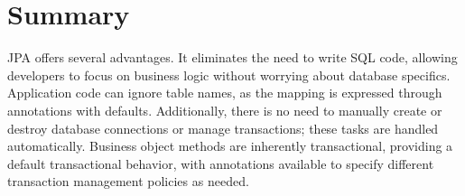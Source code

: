 \section{Summary}

JPA offers several advantages. 
It eliminates the need to write SQL code, allowing developers to focus on business logic without worrying about database specifics. 
Application code can ignore table names, as the mapping is expressed through annotations with defaults. 
Additionally, there is no need to manually create or destroy database connections or manage transactions; these tasks are handled automatically. 
Business object methods are inherently transactional, providing a default transactional behavior, with annotations available to specify different transaction management policies as needed.